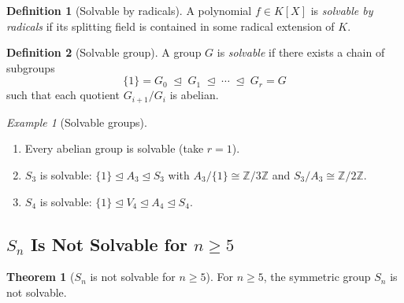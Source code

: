 \documentclass[12pt,a4paper,openany]{book}
\theoremstyle{definition}
\newtheorem{definition}{Definition}[chapter]
\newtheorem{theorem}{Theorem}[chapter]
\theoremstyle{remark}
\newtheorem{example}{Example}[chapter]
\newcommand{\Z}{\mathbb{Z}}
\begin{document}
\begin{definition}[Solvable by radicals]\label{def:solvable-radicals}
A polynomial $f\in K[X]$ is \emph{solvable by radicals} if its splitting
field is contained in some radical extension of $K$.
\end{definition}

\begin{definition}[Solvable group]\label{def:solvable-group}
A group $G$ is \emph{solvable} if there exists a chain of subgroups
\[
  \{1\} = G_{0} \;\trianglelefteq\; G_{1} \;\trianglelefteq\;
  \cdots \;\trianglelefteq\; G_{r} = G
\]
such that each quotient $G_{i+1}/G_{i}$ is abelian.
\end{definition}

\begin{example}[Solvable groups]\label{ex:solvable-groups}
\begin{enumerate}
\item Every abelian group is solvable (take $r=1$).
\item $S_{3}$ is solvable: $\{1\}\trianglelefteq A_{3}\trianglelefteq S_{3}$
      with $A_{3}/\{1\}\cong\Z/3\Z$ and $S_{3}/A_{3}\cong\Z/2\Z$.
\item $S_{4}$ is solvable:
      $\{1\}\trianglelefteq V_{4}\trianglelefteq A_{4}\trianglelefteq S_{4}$.
\end{enumerate}
\end{example}

\subsection{$S_{n}$ Is Not Solvable for $n\geq 5$}
\label{subsec:sn-not-solvable}

\begin{theorem}[$S_{n}$ is not solvable for $n\geq 5$]\label{thm:sn-not-solvable}
For $n\geq 5$, the symmetric group $S_{n}$ is not solvable.
\end{theorem}
\end{document}
